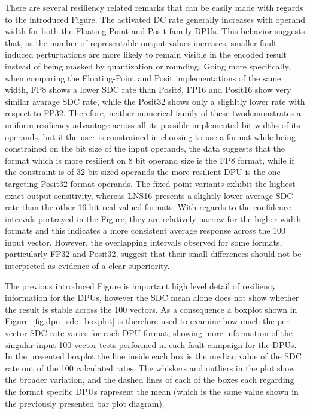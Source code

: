 There are several resiliency related remarks that can be easily made with regards to the introduced Figure. The activated DC rate generally increases with operand width for both the Floating Point and Posit family DPUs. This behavior suggests that, as the
number of representable output values increases, smaller fault-induced
perturbations are more likely to remain visible in the encoded result
instead of being masked by quantization or rounding. Going more specifically, when comparing the Floating-Point and Posit implementations of the same width, FP8 shows a lower SDC rate than Posit8, FP16 and Posit16 show very similar avarage SDC rate, while the Posit32 shows only a slighltly lower rate with respect to FP32. Therefore, neither numerical family of these twodemonstrates a uniform resiliency advantage across all its possible implemented bit widths of its operands, but if the user is constrained in choosing to use a format while being constrained on the bit size of the input operands, the data suggests that the format which is more resilient on 8 bit operand size is the FP8 format, while if the constraint is of 32 bit sized operands the more resilient DPU is the one targeting Posit32 format operands. The fixed-point variants exhibit
the highest exact-output sensitivity, whereas LNS16 presents a slightly
lower average SDC rate than the other 16-bit real-valued formats.  With regards to the confidence intervals portrayed in the Figure, they are relatively narrow for the higher-width formats and this indicates a more consistent average response across the 100 input vector. However, the overlapping intervals observed for some formats, particularly FP32 and Posit32, suggest that their small differences should not be interpreted as evidence of a clear superiority. 

The previous introduced Figure is important high level detail of resiliency information for the DPUs, however the SDC mean alone does not show whether the result is stable across the 100 vectors. As a consequence a boxplot shown in Figure~\ref{fig:dpu_sdc_boxplot} is therefore used to examine how much the per-vector SDC rate varies for each DPU format, showing more information of the singular input 100 vector tests performed in each fault campaign for the DPUs.  In the presented boxplot the line inside each box is the median value of the SDC rate out of the 100 calculated rates. The whiskers and outliers in the plot show the broader variation, and the dashed lines of each of the boxes each regarding the format specific DPUs rapresent the mean (which is the same value shown in the previously presented bar plot diagram).

